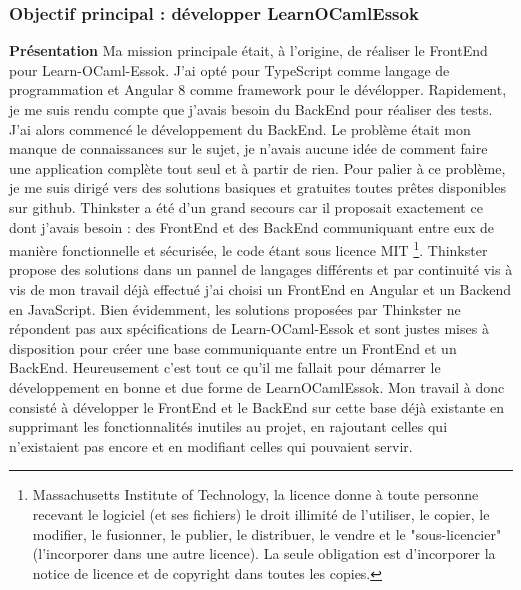 \documentclass{article}
\begin{document}
\subsubsection{Objectif principal : développer LearnOCamlEssok}
\textbf{Présentation}
\newline
\newline
Ma mission principale était, à l'origine, de réaliser le FrontEnd pour Learn-OCaml-Essok.
J'ai opté pour TypeScript comme langage de programmation et Angular 8 comme framework pour le dévélopper.
\newline
\newline
Rapidement, je me suis rendu compte que j'avais besoin du BackEnd pour réaliser des tests. J'ai alors commencé le développement du BackEnd.
Le problème était mon manque de connaissances sur le sujet, je n'avais aucune idée de comment faire une application complète tout seul et à partir de rien. Pour palier à ce problème, je me suis dirigé vers des solutions basiques et gratuites toutes prêtes disponibles sur github.
\newline
\newline
Thinkster a été d'un grand secours car il proposait exactement ce dont j'avais besoin : des FrontEnd et des BackEnd communiquant entre eux de manière fonctionnelle et sécurisée, le code étant sous licence MIT \footnote{\label{MIT} Massachusetts Institute of Technology, la licence donne à toute personne recevant le logiciel (et ses fichiers) le droit illimité de l'utiliser, le copier, le modifier, le fusionner, le publier, le distribuer, le vendre et le "sous-licencier" (l'incorporer dans une autre licence). La seule obligation est d'incorporer la notice de licence et de copyright dans toutes les copies.}.
\newline
Thinkster propose des solutions dans un pannel de langages différents et par continuité vis à vis de mon travail déjà effectué j'ai choisi un FrontEnd en Angular et un Backend en JavaScript.
\newline
\newline
Bien évidemment, les solutions proposées par Thinkster ne répondent pas aux spécifications de Learn-OCaml-Essok et sont justes mises à disposition pour créer une base communiquante entre un FrontEnd et un BackEnd. Heureusement c'est tout ce qu'il me fallait pour démarrer le développement en bonne et due forme de LearnOCamlEssok.
\newline
Mon travail à donc consisté à développer le FrontEnd et le BackEnd sur cette base déjà existante en supprimant les fonctionnalités inutiles au projet, en rajoutant celles qui n'existaient pas encore et en modifiant celles qui pouvaient servir.
\end{document}
